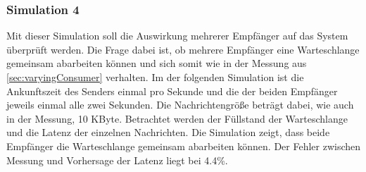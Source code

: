 \subsubsection{Simulation 4}
Mit dieser Simulation soll die Auswirkung mehrerer Empfänger auf das System überprüft werden. Die Frage dabei ist, ob mehrere Empfänger eine Warteschlange gemeinsam abarbeiten können und sich somit wie in der Messung aus \autoref{sec:varyingConsumer} verhalten. Im der folgenden Simulation ist die Ankunftszeit des Senders einmal pro Sekunde und die der beiden Empfänger jeweils einmal alle zwei Sekunden. Die Nachrichtengröße beträgt dabei, wie auch in der Messung, 10 KByte. Betrachtet werden der Füllstand der Warteschlange und die Latenz der einzelnen Nachrichten. 
Die Simulation zeigt, dass beide Empfänger die Warteschlange gemeinsam abarbeiten können. Der Fehler zwischen Messung und Vorhersage der Latenz liegt bei 4.4\%. 




